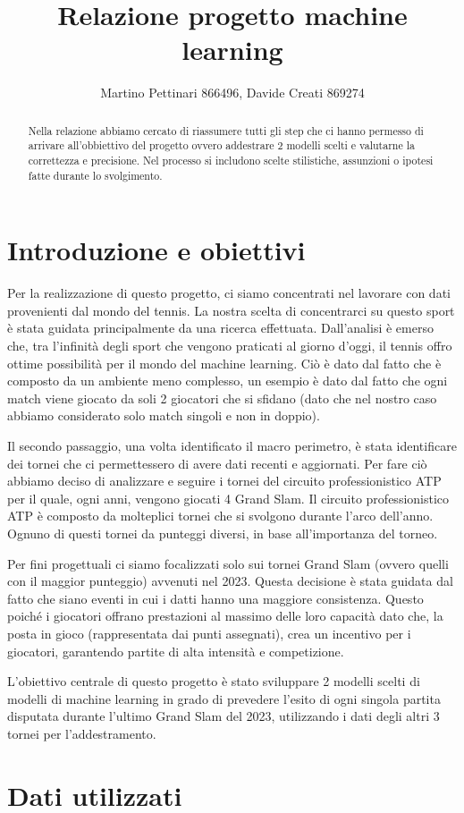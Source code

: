 \documentclass[letterpaper,12pt]{article}
\begin{document}
\title{Relazione progetto machine learning}
\author{Martino Pettinari 866496, Davide Creati 869274}
\maketitle

\begin{abstract}
Nella relazione abbiamo cercato di riassumere tutti gli step che ci hanno permesso di arrivare all'obbiettivo del progetto ovvero addestrare 2 modelli scelti e valutarne la correttezza e precisione. Nel processo si includono scelte stilistiche, assunzioni o ipotesi fatte durante lo svolgimento.
\end{abstract}


\section{Introduzione e obiettivi}

Per la realizzazione di questo progetto, ci siamo concentrati nel lavorare con dati provenienti dal mondo del tennis. La nostra scelta di concentrarci su questo sport è stata guidata principalmente da una ricerca effettuata. Dall'analisi è emerso che, tra l'infinità degli sport che vengono praticati al giorno d'oggi, il tennis offro ottime possibilità per il mondo del machine learning. Ciò è dato dal fatto che è composto da un ambiente meno complesso, un esempio è dato dal fatto che ogni match viene giocato da soli 2 giocatori che si sfidano (dato che nel nostro caso abbiamo considerato solo match singoli e non in doppio). 

Il secondo passaggio, una volta identificato il macro perimetro, è stata identificare dei tornei che ci permettessero di avere dati recenti e aggiornati. Per fare ciò abbiamo deciso di analizzare e seguire i tornei del circuito professionistico ATP per il quale, ogni anni, vengono giocati 4 Grand Slam. Il circuito professionistico ATP è composto da molteplici tornei che si svolgono durante l'arco dell'anno. Ognuno di questi tornei da punteggi diversi, in base all'importanza del torneo. 

Per fini progettuali ci siamo focalizzati solo sui tornei Grand Slam (ovvero quelli con il maggior punteggio) avvenuti nel 2023. Questa decisione è stata guidata dal fatto che siano eventi in cui i datti hanno una maggiore consistenza. Questo poiché i giocatori offrano prestazioni al massimo delle loro capacità dato che, la posta in gioco (rappresentata dai punti assegnati), crea un incentivo per i giocatori, garantendo partite di alta intensità e competizione. 

L'obiettivo centrale di questo progetto è stato sviluppare 2 modelli scelti di modelli di machine learning in grado di prevedere l'esito di ogni singola partita disputata durante l'ultimo Grand Slam del 2023, utilizzando i dati degli altri 3 tornei per l'addestramento. 

\section{Dati utilizzati}
\end{document}
